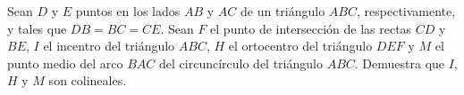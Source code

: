 Sean $D$ y $E$ puntos en los lados $AB$ y $AC$ de un triángulo $ABC$, respectivamente, y
tales que $DB = BC = CE$. Sean $F$ el punto de intersección de las rectas $CD$ y $BE$, $I$ el incentro del
triángulo $ABC$, $H$ el ortocentro del triángulo $DEF$ y $M$ el punto medio del arco $BAC$ del circuncírculo
del triángulo $ABC$. Demuestra que $I$, $H$ y $M$ son colineales.
